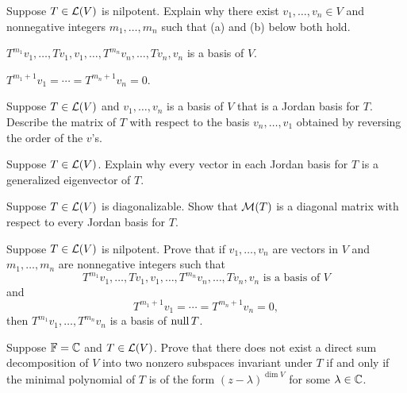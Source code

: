 \begin{exc}
\begin{exercise}
Suppose $T\in\mathcal{L}(V)$ is nilpotent. Explain why there exist
$v_1,\dots,v_n\in V$ and nonnegative integers $m_1,\dots,m_n$ such that (a)
and (b) below both hold.
\begin{parts}
\item $T^{m_1}v_1,\dots,Tv_1,v_1,\dots,T^{m_n}v_n,\dots,Tv_n,v_n$ is a basis
  of $V$.
\item $T^{m_1+1}v_1=\cdots=T^{m_n+1}v_n=0$.
\end{parts}
\end{exercise}

\begin{exercise}
Suppose $T\in\mathcal{L}(V)$ and $v_1,\dots,v_n$ is a basis of $V$ that is a Jordan
basis for $T$. Describe the matrix of $T$ with respect to the basis
$v_n,\dots,v_1$ obtained by reversing the order of the $v$'s.
\end{exercise}

\begin{exercise}
Suppose $T\in\mathcal{L}(V)$. Explain why every vector in each Jordan basis for $T$ is
a generalized eigenvector of $T$.
\end{exercise}

\begin{exercise}
Suppose $T\in\mathcal{L}(V)$ is diagonalizable. Show that $\mathcal{M}(T)$ is a diagonal
matrix with respect to every Jordan basis for $T$.
\end{exercise}

\begin{exercise}
Suppose $T\in\mathcal{L}(V)$ is nilpotent. Prove that if $v_1,\dots,v_n$ are vectors
in $V$ and $m_1,\dots,m_n$ are nonnegative integers such that
\[ T^{m_1}v_1,\dots,Tv_1,v_1,\dots,T^{m_n}v_n,\dots,Tv_n,v_n \text{ is a basis
of } V \]
and
\[ T^{m_1+1}v_1=\cdots=T^{m_n+1}v_n=0, \]
then $T^{m_1}v_1,\dots,T^{m_n}v_n$ is a basis of $\operatorname{null} T$.
\end{exercise}

\begin{exercise}
Suppose $\mathbb{F}=\mathbb{C}$ and $T\in\mathcal{L}(V)$. Prove that there does not exist a direct sum
decomposition of $V$ into two nonzero subspaces invariant under $T$ if and only
if the minimal polynomial of $T$ is of the form $(z-\lambda)^{\dim V}$ for some
$\lambda\in\mathbb{C}$.
\end{exercise}
\end{exc}
